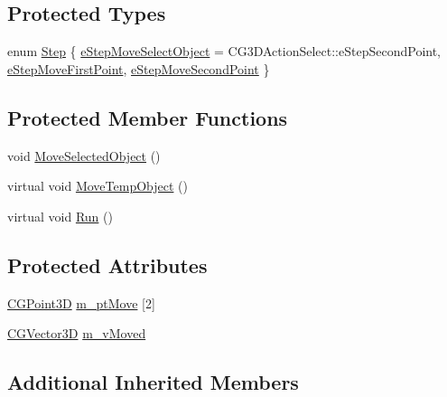 \subsection*{Protected Types}
\begin{DoxyCompactItemize}
\item 
enum \hyperlink{class_c_g3_d_action_move_aa199db43e2fc824a87f8aa03dca6bb0f}{Step} \{ \hyperlink{class_c_g3_d_action_move_aa199db43e2fc824a87f8aa03dca6bb0facdb55e83c9ae553cb1518d2258a80f6d}{e\+Step\+Move\+Select\+Object} = C\+G3\+D\+Action\+Select\+:\+:e\+Step\+Second\+Point, 
\hyperlink{class_c_g3_d_action_move_aa199db43e2fc824a87f8aa03dca6bb0fa7ea5574adcdb974f08eb2a3c6c0f219e}{e\+Step\+Move\+First\+Point}, 
\hyperlink{class_c_g3_d_action_move_aa199db43e2fc824a87f8aa03dca6bb0fa19ca959a82e7b7bf1d3074266b270e92}{e\+Step\+Move\+Second\+Point}
 \}
\end{DoxyCompactItemize}
\subsection*{Protected Member Functions}
\begin{DoxyCompactItemize}
\item 
void \hyperlink{class_c_g3_d_action_move_a0b3df4bc9ba9cea497c408440bbbfa14}{Move\+Selected\+Object} ()
\item 
virtual void \hyperlink{class_c_g3_d_action_move_a445e4dbee7042a41fafa6276d9e0b352}{Move\+Temp\+Object} ()
\item 
virtual void \hyperlink{class_c_g3_d_action_move_ac52089a819f969304c8918f1a87411aa}{Run} ()
\end{DoxyCompactItemize}
\subsection*{Protected Attributes}
\begin{DoxyCompactItemize}
\item 
\hyperlink{class_c_g_point3_d}{C\+G\+Point3\+D} \hyperlink{class_c_g3_d_action_move_a7b4b01175e91ee12c2dc6714372acdbf}{m\+\_\+pt\+Move} \mbox{[}2\mbox{]}
\item 
\hyperlink{_g_point3_d_8h_aa7e73d39f4c991acb5a13c84b498366d}{C\+G\+Vector3\+D} \hyperlink{class_c_g3_d_action_move_a601d0a4ab20bc6722313042f9bd26610}{m\+\_\+v\+Moved}
\end{DoxyCompactItemize}
\subsection*{Additional Inherited Members}


